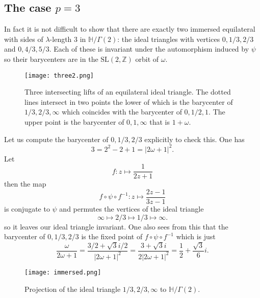 \documentclass[12pt]{amsart}
\theoremstyle{plain}
\theoremstyle{definition}
\def\HH{\mathbb{H}}
\def\xx{\HH/g2}
\def\ZZ{\mathbb{Z}}
\def\sl2{\mathrm{SL}(2, \ZZ)}
\def\g2{\Gamma(2)}
\def\xx{\HH/\g2}
\begin{document}
\subsection{The case $p=3$}


In fact it is not difficult to show that there
are exactly two immersed equilateral 
with sides of  $\lambda$-length $3$ in $\xx$:
the  ideal triangles with vertices $0,1/3,2/3$ 
and   $0,4/3,5/3$.
Each of these is invariant under the 
automorphism induced by $\psi$
so their barycenters are in the $\sl2$ orbit 
of $\omega$.

  \begin{figure}[hb]
\begin{center}
\texttt{[image: three2.png]} 
\end{center}
\caption{Three intersecting  lifts  of an equilateral ideal triangle.
The dotted lines intersect in two points the lower of which 
is the barycenter of $1/3, 2/3,\infty$
which coincides with the barycenter of $0, 1/2,1$.
The upper point is the barycenter of $0,1,\infty$
that is $1+\omega$.}
\end{figure}
Let us compute the barycenter of $0,1/3,2/3$ explicitly to check this. 
One has
$$3 = 2^2 - 2 + 1 = | 2\omega + 1 |^2.$$
Let
$$f :  z \mapsto \frac{1}{2z+1}$$
then the map
$$ f \circ \psi \circ f^{-1} :  z \mapsto \frac{2z - 1}{3z -1}$$
is conjugate to $\psi$ and permutes the vertices of the ideal triangle
$$ \infty \mapsto 2/3 \mapsto 1/3 \mapsto \infty.$$
so it leaves our ideal triangle invariant.
One also sees from this  that the barycenter of $0,1/3,2/3$
is the fixed point of $ f \circ \psi \circ f^{-1}$ 
which is just
$$ \frac{\omega}{2\omega+1} 
= \frac{3/ 2+ \sqrt{3}i/2 }{| 2\omega + 1 |^2}
= \frac{3+ \sqrt{3}i }{2| 2\omega + 1 |^2}
= \frac12 +  \frac{\sqrt{3}}{6} i.  $$




\begin{figure}[ht]
\begin{center}
\texttt{[image: immersed.png]} 
\end{center}
\caption{Projection of  the ideal triangle $1/3, 2/3,\infty$
to $\xx$.}
\end{figure}
\end{document}
